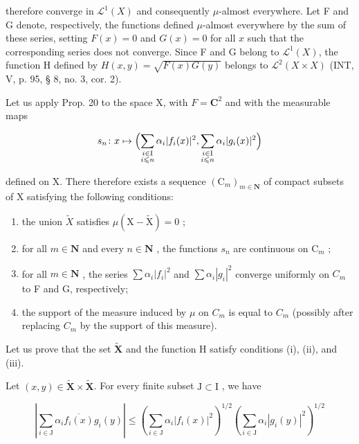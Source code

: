 therefore converge in \(\mathcal{L}^{1}(X)\) and consequently \(\mu\)-almost everywhere. Let F and G denote, respectively, the functions defined \(\mu\)-almost everywhere by the sum of these series, setting \(F(x) = 0\) and \(G(x) = 0\) for all \(x\) such that the corresponding series does not converge. Since F and G belong to \(\mathcal{L}^{1}(X)\), the function H defined by \(H(x,y) = \sqrt{F(x)G(y)}\) belongs to \(\mathcal{L}^{2}(X \times X)\) (INT, V, p. 95, § 8, no. 3, cor. 2).

Let us apply Prop. 20 to the space X, with \(F = \mathbf{C}^{2}\) and with the measurable maps

\[
s_{n}\colon x\mapsto \Bigl (\sum_{\substack{i\in \mathrm{I}\\ i\leqslant n}}\alpha_{i}|f_{i}(x)|^{2},\sum_{\substack{i\in \mathrm{I}\\ i\leqslant n}}\alpha_{i}|g_{i}(x)|^{2}\Bigr)
\]

defined on X. There therefore exists a sequence \((\mathrm{C}_{m})_{m\in\mathbf{N}}\) of compact subsets of X satisfying the following conditions:

\begin{enumerate}
\def\labelenumi{(\arabic{enumi})}
\item
  the union \(\widetilde{X}\) satisfies \(\mu(\mathrm{X}-\widetilde{\mathrm{X}})=0\) ;
\item
  for all \(m \in \mathbf{N}\) and every \(n \in \mathbf{N}\) , the functions \(s_n\) are continuous on \(\mathrm{C}_m\) ;
\item
  for all \(m \in \mathbf{N}\) , the series \(\sum \alpha_{i}|f_{i}|^{2}\) and \(\sum \alpha_{i}|g_{i}|^{2}\) converge uniformly on \(C_{m}\) to F and G, respectively;
\item
  the support of the measure induced by \(\mu\) on \(C_{m}\) is equal to \(C_{m}\) (possibly after replacing \(C_{m}\) by the support of this measure).
\end{enumerate}

Let us prove that the set \(\widetilde{\mathbf{X}}\) and the function H satisfy conditions (i), (ii), and (iii).

Let \((x,y)\in \widetilde{\mathbf{X}}\times \widetilde{\mathbf{X}}\). For every finite subset \(\mathrm{J}\subset \mathrm{I}\) , we have

\[
\left| \sum_ {i \in \mathrm{J}} \alpha_ {i} \overline {{f _ {i} (x)}} g _ {i} (y) \right| \leqslant \left(\sum_ {i \in \mathrm{J}} \alpha_ {i} | f _ {i} (x) | ^ {2}\right) ^ {1 / 2} \left(\sum_ {i \in \mathrm{J}} \alpha_ {i} | g _ {i} (y) | ^ {2}\right) ^ {1 / 2}\tag{15}
\]

